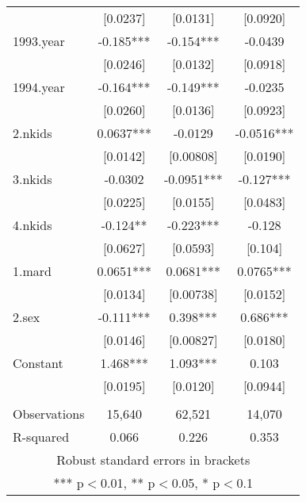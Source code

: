 \documentclass[]{article}
\begin{document}
\begin{tabular}{lccc}
 & [0.0237] & [0.0131] & [0.0920] \\
1993.year & -0.185*** & -0.154*** & -0.0439 \\
 & [0.0246] & [0.0132] & [0.0918] \\
1994.year & -0.164*** & -0.149*** & -0.0235 \\
 & [0.0260] & [0.0136] & [0.0923] \\
2.nkids & 0.0637*** & -0.0129 & -0.0516*** \\
 & [0.0142] & [0.00808] & [0.0190] \\
3.nkids & -0.0302 & -0.0951*** & -0.127*** \\
 & [0.0225] & [0.0155] & [0.0483] \\
4.nkids & -0.124** & -0.223*** & -0.128 \\
 & [0.0627] & [0.0593] & [0.104] \\
1.mard & 0.0651*** & 0.0681*** & 0.0765*** \\
 & [0.0134] & [0.00738] & [0.0152] \\
2.sex & -0.111*** & 0.398*** & 0.686*** \\
 & [0.0146] & [0.00827] & [0.0180] \\
Constant & 1.468*** & 1.093*** & 0.103 \\
 & [0.0195] & [0.0120] & [0.0944] \\
 &  &  &  \\
Observations & 15,640 & 62,521 & 14,070 \\
 R-squared & 0.066 & 0.226 & 0.353 \\ \hline
\multicolumn{4}{c}{ Robust standard errors in brackets} \\
\multicolumn{4}{c}{ *** p$<$0.01, ** p$<$0.05, * p$<$0.1} \\
\end{tabular}
\end{document}

